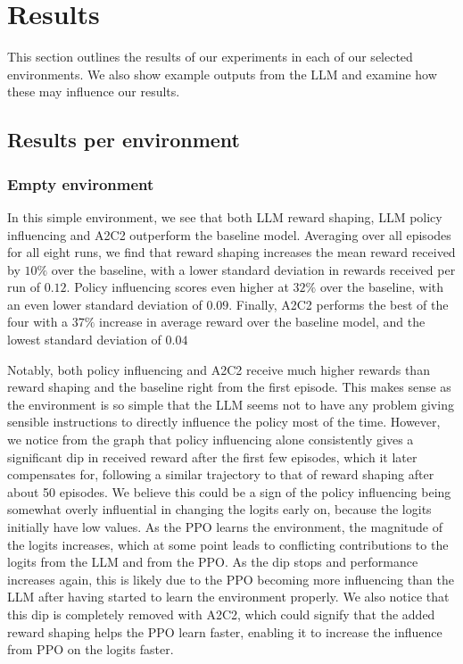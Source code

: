 \documentclass[conference]{IEEEtran}
\begin{document}
\section{Results}

This section outlines the results of our experiments in each of our selected environments. We also show example outputs from the LLM and examine how these may influence our results.

\subsection{Results per environment}

\subsubsection{Empty environment}
\label{emptyresultstext}

In this simple environment, we see that both LLM reward shaping, LLM policy influencing and A2C2 outperform the baseline model. Averaging over all episodes for all eight runs, we find that reward shaping increases the mean reward received by $10\%$ over the baseline, with a lower standard deviation in rewards received per run of $0.12$. Policy influencing scores even higher at $32\%$ over the baseline, with an even lower standard deviation of $0.09$. Finally, A2C2 performs the best of the four with a $37\%$ increase in average reward over the baseline model, and the lowest standard deviation of $0.04$

Notably, both policy influencing and A2C2 receive much higher rewards than reward shaping and the baseline right from the first episode. This makes sense as the environment is so simple that the LLM seems not to have any problem giving sensible instructions to directly influence the policy most of the time. However, we notice from the graph that policy influencing alone consistently gives a significant dip in received reward after the first few episodes, which it later compensates for, following a similar trajectory to that of reward shaping after about 50 episodes. We believe this could be a sign of the policy influencing being somewhat overly influential in changing the logits early on, because the logits initially have low values. As the PPO learns the environment, the magnitude of the logits increases, which at some point leads to conflicting contributions to the logits from the LLM and from the PPO. As the dip stops and performance increases again, this is likely due to the PPO becoming more influencing than the LLM after having started to learn the environment properly. We also notice that this dip is completely removed with A2C2, which could signify that the added reward shaping helps the PPO learn faster, enabling it to increase the influence from PPO on the logits faster.
\end{document}
